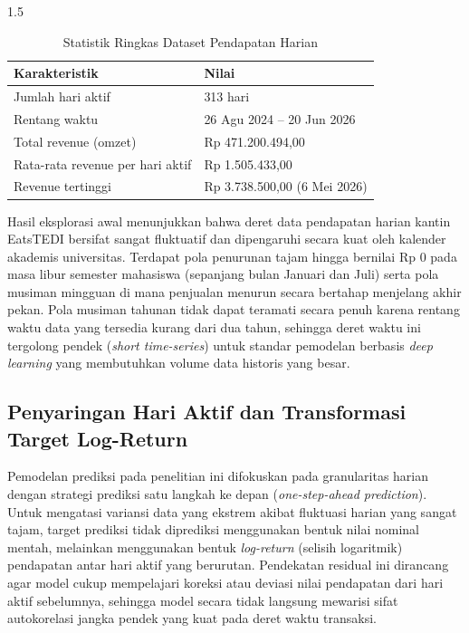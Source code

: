 \documentclass[12pt, a4paper, onecolumn, oneside]{report}
\begin{document}
\begin{spacing}{1.5}
\begin{table}[H]
\centering
\caption{Statistik Ringkas Dataset Pendapatan Harian}
\label{tab:statistik_revenue_harian}
\begin{tabular}{|l|l|}
\hline
\textbf{Karakteristik} & \textbf{Nilai} \\ \hline
Jumlah hari aktif & 313 hari \\ \hline
Rentang waktu & 26 Agu 2024 -- 20 Jun 2026 \\ \hline
Total revenue (omzet) & Rp 471.200.494,00 \\ \hline
Rata-rata revenue per hari aktif & Rp 1.505.433,00 \\ \hline
Revenue tertinggi & Rp 3.738.500,00 (6 Mei 2026) \\ \hline
\end{tabular}
\end{table}

Hasil eksplorasi awal menunjukkan bahwa deret data pendapatan harian kantin EatsTEDI bersifat sangat fluktuatif dan dipengaruhi secara kuat oleh kalender akademis universitas. Terdapat pola penurunan tajam hingga bernilai Rp 0 pada masa libur semester mahasiswa (sepanjang bulan Januari dan Juli) serta pola musiman mingguan di mana penjualan menurun secara bertahap menjelang akhir pekan. Pola musiman tahunan tidak dapat teramati secara penuh karena rentang waktu data yang tersedia kurang dari dua tahun, sehingga deret waktu ini tergolong pendek (\textit{short time-series}) untuk standar pemodelan berbasis \textit{deep learning} yang membutuhkan volume data historis yang besar.

\subsection{Penyaringan Hari Aktif dan Transformasi Target Log-Return}

Pemodelan prediksi pada penelitian ini difokuskan pada granularitas harian dengan strategi prediksi satu langkah ke depan (\textit{one-step-ahead prediction}). Untuk mengatasi variansi data yang ekstrem akibat fluktuasi harian yang sangat tajam, target prediksi tidak diprediksi menggunakan bentuk nilai nominal mentah, melainkan menggunakan bentuk \textit{log-return} (selisih logaritmik) pendapatan antar hari aktif yang berurutan. Pendekatan residual ini dirancang agar model cukup mempelajari koreksi atau deviasi nilai pendapatan dari hari aktif sebelumnya, sehingga model secara tidak langsung mewarisi sifat autokorelasi jangka pendek yang kuat pada deret waktu transaksi.


\end{spacing}
\end{document}
